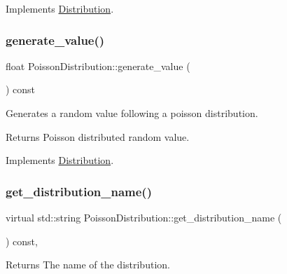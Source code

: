 Implements \hyperlink{classDistribution_a0778c93fb686dd1abe2830e1c7e564a6}{Distribution}.

\mbox{\label{classPoissonDistribution_ab9c01eabf7c125677da2dc56d23e4212}} 
\subsubsection{\texorpdfstring{generate\+\_\+value()}{generate\_value()}}
{\footnotesize\ttfamily float Poisson\+Distribution\+::generate\+\_\+value (\begin{DoxyParamCaption}{ }\end{DoxyParamCaption}) const\hspace{0.3cm}{\ttfamily [virtual]}}

Generates a random value following a poisson distribution. \begin{DoxyReturn}{Returns}
Poisson distributed random value. 
\end{DoxyReturn}


Implements \hyperlink{classDistribution_aa1ea89994ac123f003b8b8f5fe6fad40}{Distribution}.

\mbox{\label{classPoissonDistribution_a2c6ac9d330241badbdeadc065ad47c1e}} 
\subsubsection{\texorpdfstring{get\+\_\+distribution\+\_\+name()}{get\_distribution\_name()}}
{\footnotesize\ttfamily virtual std\+::string Poisson\+Distribution\+::get\+\_\+distribution\+\_\+name (\begin{DoxyParamCaption}{ }\end{DoxyParamCaption}) const\hspace{0.3cm}{\ttfamily [inline]}, {\ttfamily [virtual]}}

\begin{DoxyReturn}{Returns}
The name of the distribution. 
\end{DoxyReturn}


